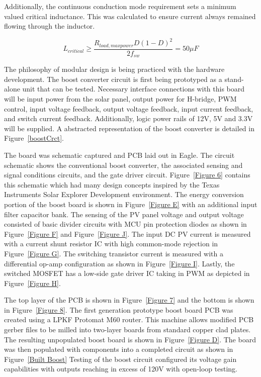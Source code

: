 Additionally, the continuous conduction mode requirement sets a minimum valued critical inductance. This was calculated to ensure current always remained flowing through the inductor.%

\begin{equation}
 L_{critical} \ge \frac{R_{load,maxpower}D(1-D)^2}{2f_{sw}}= 50 \mu F
\end{equation}

The philosophy of modular design is being practiced with the hardware development. The boost converter circuit is first being prototyped as a stand-alone unit that can be tested. Necessary interface connections with this board will be input power from the solar panel, output power for H-bridge, PWM control, input voltage feedback, output voltage feedback, input current feedback, and switch current feedback. Additionally, logic power rails of 12V, 5V and 3.3V will be supplied. A abstracted representation of the boost converter is detailed in Figure~\ref{boostCrct}.

The board was schematic captured and PCB laid out in Eagle. The circuit schematic shows the conventional boost converter, the associated sensing and signal conditions circuits, and the gate driver circuit. Figure~\ref{Figure 6} contains this schematic which had many design concepts inspired by the Texas Instruments Solar Explorer Development environment.\cite{tiAppReportControl} The energy conversion portion of the boost board is shown in Figure~\ref{Figure E} with an additional input filter capacitor bank. The sensing of the PV panel voltage and output voltage consisted of basic divider circuits with MCU pin protection diodes as shown in Figure~\ref{Figure F} and Figure~\ref{Figure J}. The input DC PV current is measured with a current shunt resistor IC with high common-mode rejection in Figure~\ref{Figure G}. The switching transistor current is measured with a differential op-amp configuration as shown in Figure~\ref{Figure I}. Lastly, the switched MOSFET has a low-side gate driver IC taking in PWM as depicted in Figure~\ref{Figure H}. 

The top layer of the PCB is shown in Figure~\ref{Figure 7} and the bottom is shown in Figure~\ref{Figure 8}. The first generation prototype boost board PCB was created using a LPKF Protomat M60 router. This machine allows modified PCB gerber files to be milled into two-layer boards from standard copper clad plates. The resulting unpopulated boost board is shown in Figure~\ref{Figure D}. The board was then populated with components into a completed circuit as shown in Figure~\ref{Built Boost} Testing of the boost circuit configured its voltage gain capabilities with outputs reaching in excess of 120V with open-loop testing.

